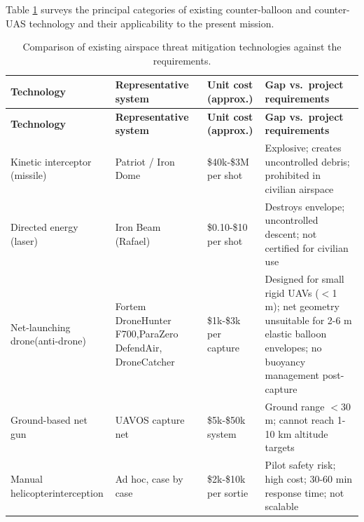 Table \ref{tab:market_solutions} surveys the principal categories of existing counter-balloon and counter-UAS technology and their applicability to the present mission.
 
\begin{longtable}{@{}p{3.2cm}p{3.4cm}p{2.5cm}p{5.5cm}@{}}
\caption{Comparison of existing airspace threat mitigation technologies
  against the requirements.}
\label{tab:market_solutions} \\

\toprule
\textbf{Technology} & \textbf{Representative system} & \textbf{Unit cost (approx.)} & \textbf{Gap vs.\ project requirements} \\
\midrule
\endfirsthead

\toprule
\textbf{Technology} & \textbf{Representative system} & \textbf{Unit cost (approx.)} & \textbf{Gap vs.\ project requirements} \\
\midrule
\endhead

Kinetic interceptor (missile) &
  Patriot / Iron Dome &
  \$40k-\$3M per shot \cite{UAVDefence2025NewMicrowaves} &
  Explosive; creates uncontrolled debris; prohibited in civilian airspace \\[4pt]
 
Directed energy (laser) &
  Iron Beam (Rafael) &
  \$0.10-\$10 per shot \cite{UAVDefence2025NewMicrowaves} &
  Destroys envelope; uncontrolled descent; not certified for civilian use \\[4pt]
 
Net-launching drone\newline(anti-drone) &
  Fortem DroneHunter F700,\newline ParaZero DefendAir, DroneCatcher &
  \$1k-\$3k per capture \cite{UAVDefence2025NewMicrowaves} &
  Designed for small rigid UAVs ($<$1 m); net geometry unsuitable for
  2-6 m elastic balloon envelopes; no buoyancy management post-capture \\[4pt]
 
Ground-based net gun &
  UAVOS capture net &
  \$5k-\$50k system &
  Ground range $<$30 m; cannot reach 1-10 km altitude targets \cite{AirsightSecurity2024AirTechnology} \\[4pt]
 
Manual helicopter\newline interception &
  Ad hoc, case by case &
  \$2k-\$10k per sortie &
  Pilot safety risk; high cost; 30-60 min response time; not scalable \\[4pt]


\bottomrule
\end{longtable}
\normalsize
 
